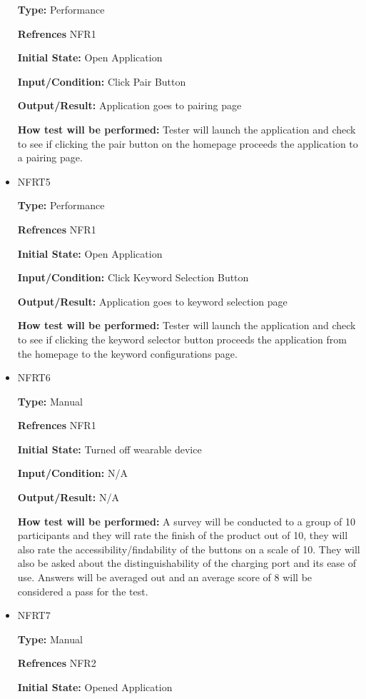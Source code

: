 \documentclass[12pt, titlepage]{article}
\begin{document}
\begin{itemize}
\textbf{Type:} Performance 

\textbf{Refrences} NFR1
					
\textbf{Initial State:} Open Application
					
\textbf{Input/Condition:} Click Pair Button
					
\textbf{Output/Result:} Application goes to pairing page
					
\textbf{How test will be performed:} Tester will launch the application and check to see if clicking the pair button on the homepage proceeds the application to a pairing page.

\item{NFRT5}

\textbf{Type:} Performance

\textbf{Refrences} NFR1
					
\textbf{Initial State:} Open Application
					
\textbf{Input/Condition:} Click Keyword Selection Button
					
\textbf{Output/Result:} Application goes to keyword selection page
					
\textbf{How test will be performed:} Tester will launch the application and check to see if clicking the keyword selector button proceeds the application from the homepage to the keyword configurations page.

\item{NFRT6}

\textbf{Type:} Manual

\textbf{Refrences} NFR1
					
\textbf{Initial State:} Turned off wearable device
					
\textbf{Input/Condition:} N/A
					
\textbf{Output/Result:} N/A
					
\textbf{How test will be performed:} A survey will be conducted to a group of 10 participants and they will rate the finish of the product out of 10, they will also rate the accessibility/findability of the buttons on a scale of 10. They will also be asked about the distinguishability of the charging port and its ease of use.  Answers will be averaged out and an average score of 8 will be considered a pass for the test. 

\item{NFRT7}

\textbf{Type:} Manual

\textbf{Refrences} NFR2
					
\textbf{Initial State:} Opened Application
					

\end{itemize}
\end{document}
